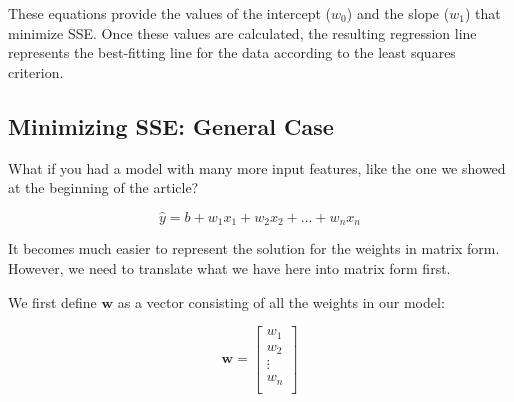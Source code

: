    These equations provide the values of the intercept (\( w_0 \)) and the slope (\( w_1 \)) that minimize SSE. Once these values are calculated, the resulting regression line represents the best-fitting line for the data according to the least squares criterion.
\subsection{Minimizing SSE: General Case}
    \large What if you had a model with many more input features, like the one we showed at the beginning of the article?

    $$\hat{y} = b + w_1x_1 + w_2x_2 + ... + w_nx_n$$

    It becomes much easier to represent the solution for the weights in matrix form. However, we need to translate what we have here into matrix form first.
    
    We first define $\textbf{w}$ as a vector consisting of all the weights in our model:

    $$\textbf{w} = \begin{bmatrix}
            w_1\\
            w_2\\
            \vdots\\
            w_n\\
            \end{bmatrix}$$

